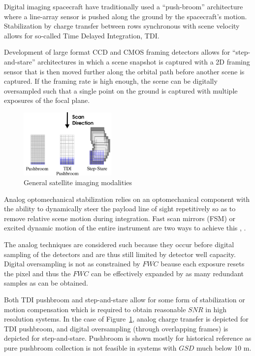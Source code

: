 \documentclass[10pt,journal]{IEEEtran}  %
\begin{document}
Digital imaging spacecraft have traditionally used a ``push-broom'' architecture where a line-array sensor is pushed along the ground by the spacecraft's motion.  Stabilization by charge transfer between rows synchronous with scene velocity allows for so-called Time Delayed Integration, TDI.  

Development of large format CCD and CMOS framing detectors allows for ``step-and-stare'' architectures in which a scene snapshot is captured with a 2D framing sensor that is then moved further along the orbital path before another scene is captured.  If the framing rate is high enough, the scene can be digitally oversampled such that a single point on the ground is captured with multiple exposures of the focal plane.

\begin{figure}[h!t]
\includegraphics[width=0.42\textwidth]{figures/modalities.png}
\caption{General satellite imaging modalities}
\label{fig:modalities}
\end{figure}

Analog optomechanical stabilization relies on an optomechanical component with the ability to dynamically steer the payload line of sight repetitively so as to remove relative scene motion during integration.  Fast scan mirrors (FSM) or excited dynamic motion of the entire instrument are two ways to achieve this \cite{patent:jonny}, \cite{patent:dirk}.

The analog techniques are considered such because they occur before digital sampling of the detectors and are thus still limited by detector well capacity.  Digital oversampling is not as constrained by $FWC$ beause each exposure resets the pixel and thus the $FWC$ can be effectively expanded by as many redundant samples as can be obtained.

Both TDI pushbroom and step-and-stare allow for some form of stabilization or motion compensation which is required to obtain reasonable $SNR$ in high resolution systems.  In the case of Figure~\ref{fig:modalities}, analog charge transfer is depicted for TDI pushbroom, and digital oversampling (through overlapping frames) is depicted for step-and-stare.  Pushbroom is shown mostly for historical reference as pure pushbroom collection is not feasible in systems with $GSD$ much below 10 m.
\end{document}
